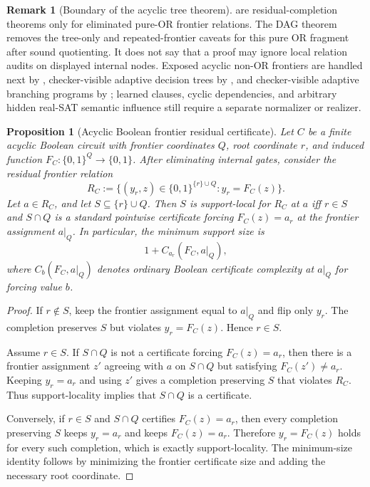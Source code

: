 \documentclass[11pt]{article}
\newtheorem{proposition}[theorem]{Proposition}
\theoremstyle{definition}
\newtheorem{remark}[theorem]{Remark}
\newcommand{\bits}{\{0,1\}}
\begin{document}
\begin{remark}[Boundary of the acyclic tree theorem]\label{rem:acyclic-or-boundary}
 are residual-completion theorems only for eliminated pure-OR frontier relations.  The DAG theorem removes the tree-only and repeated-frontier caveats for this pure OR fragment after sound quotienting.  It does not say that a proof may ignore local relation audits on displayed internal nodes.  Exposed acyclic non-OR frontiers are handled next by , checker-visible adaptive decision trees by , and checker-visible adaptive branching programs by ; learned clauses, cyclic dependencies, and arbitrary hidden real-SAT semantic influence still require a separate normalizer or realizer.
\end{remark}

\begin{proposition}[Acyclic Boolean frontier residual certificate]\label{prop:acyclic-boolean-frontier-residual}
Let \(C\) be a finite acyclic Boolean circuit with frontier coordinates \(Q\), root coordinate \(r\), and induced function \(F_C:\bits^Q\to\bits\).  After eliminating internal gates, consider the residual frontier relation
\[
  R_C
  :=
  \{(y_r,z)\in\bits^{\{r\}\cup Q}: y_r=F_C(z)\}.
\]
Let \(a\in R_C\), and let \(S\subseteq\{r\}\cup Q\).  Then \(S\) is support-local for \(R_C\) at \(a\) iff \(r\in S\) and \(S\cap Q\) is a standard pointwise certificate forcing \(F_C(z)=a_r\) at the frontier assignment \(a|_Q\).  In particular, the minimum support size is
\[
  1+C_{a_r}(F_C,a|_Q),
\]
where \(C_b(F_C,a|_Q)\) denotes ordinary Boolean certificate complexity at \(a|_Q\) for forcing value \(b\).
\end{proposition}

\begin{proof}
If \(r\notin S\), keep the frontier assignment equal to \(a|_Q\) and flip only \(y_r\).  The completion preserves \(S\) but violates \(y_r=F_C(z)\).  Hence \(r\in S\).

Assume \(r\in S\).  If \(S\cap Q\) is not a certificate forcing \(F_C(z)=a_r\), then there is a frontier assignment \(z'\) agreeing with \(a\) on \(S\cap Q\) but satisfying \(F_C(z')\ne a_r\).  Keeping \(y_r=a_r\) and using \(z'\) gives a completion preserving \(S\) that violates \(R_C\).  Thus support-locality implies that \(S\cap Q\) is a certificate.

Conversely, if \(r\in S\) and \(S\cap Q\) certifies \(F_C(z)=a_r\), then every completion preserving \(S\) keeps \(y_r=a_r\) and keeps \(F_C(z)=a_r\).  Therefore \(y_r=F_C(z)\) holds for every such completion, which is exactly support-locality.  The minimum-size identity follows by minimizing the frontier certificate size and adding the necessary root coordinate.
\end{proof}
\end{document}
